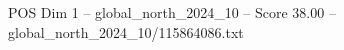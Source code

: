 \begin{textsample}{POS Dim 1 – global\_north\_2024\_10 – Score 38.00 – global\_north\_2024\_10/115864086.txt}
\end{textsample}
